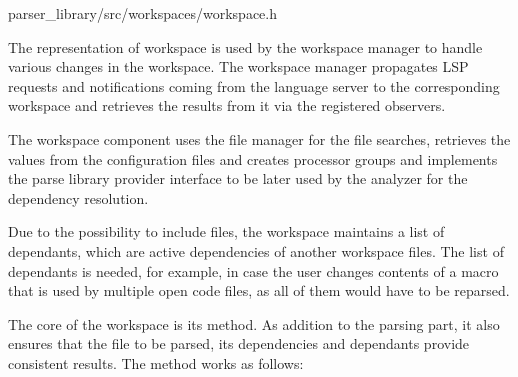 
{parser\_library/src/workspaces/workspace.h}

The representation of workspace is used by the workspace manager to handle various changes in the workspace. The workspace manager propagates LSP requests and notifications coming from the language server to the corresponding workspace and retrieves the results from it via the registered observers.

The workspace component uses the file manager for the file searches, retrieves the values from the configuration files and creates processor groups and implements the parse library provider interface to be later used by the analyzer for the dependency resolution.

Due to the possibility to include files, the workspace maintains a list of dependants, which are  active dependencies of another workspace files. The list of dependants is needed, for example, in case the user changes contents of a macro that is used by multiple open code files, as all of them would have to be reparsed.

The core of the workspace is its  method. As addition to the parsing part, it also ensures that the file to be parsed, its dependencies and dependants provide consistent results. The method works as follows:

